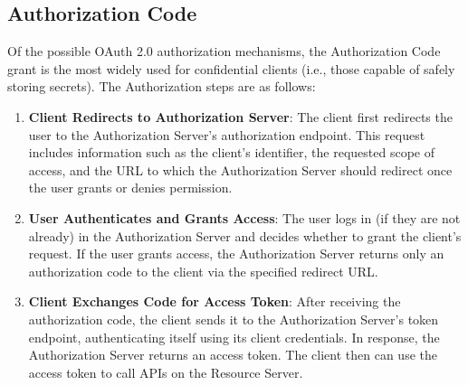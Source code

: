%
%
%

\subsection{Authorization Code}
\label{cha:relatedwork:oauth:authcode}

Of the possible OAuth 2.0 authorization mechanisms,
the Authorization Code grant is the most widely used for confidential clients (i.e., those capable of safely storing secrets).
The Authorization steps are as follows:

\begin{enumerate}

  \item \textbf{Client Redirects to Authorization Server}:
    The client first redirects the user to the Authorization Server’s authorization endpoint.
    This request includes information such as the client’s identifier, the requested scope of access,
    and the URL to which the Authorization Server should redirect once the user grants or denies permission.

  \item \textbf{User Authenticates and Grants Access}:
    The user logs in (if they are not already) in the Authorization Server and decides whether to grant the client’s request.
    If the user grants access, the Authorization Server returns only an authorization code to the client via the specified redirect URL.

  \item \textbf{Client Exchanges Code for Access Token}:
    After receiving the authorization code, the client sends it to the Authorization Server’s token endpoint,
    authenticating itself using its client credentials.
    In response, the Authorization Server returns an access token.
    The client then can use the access token to call APIs on the Resource Server.
\end{enumerate}

